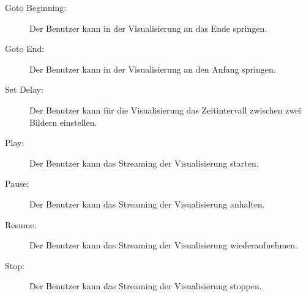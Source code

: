 \begin{description}
  \item[Goto Beginning:] Der Benutzer kann in der Visualisierung an das Ende springen.
% 

  \item[Goto End:] Der Benutzer kann in der Visualisierung an den Anfang springen.
% 

  \item[Set Delay:] Der Benutzer kann f\"ur die Visualisierung das Zeitintervall zwischen zwei Bildern einstellen.
% 

  \item[Play:] Der Benutzer kann das Streaming der Visualisierung starten.
% 

  \item[Pause:] Der Benutzer kann das Streaming der Visualisierung anhalten.
% 

  \item[Resume:] Der Benutzer kann das Streaming der Visualisierung wiederaufnehmen.
% 

  \item[Stop:] Der Benutzer kann das Streaming der Visualisierung stoppen.
% 
\end{description}
% 
